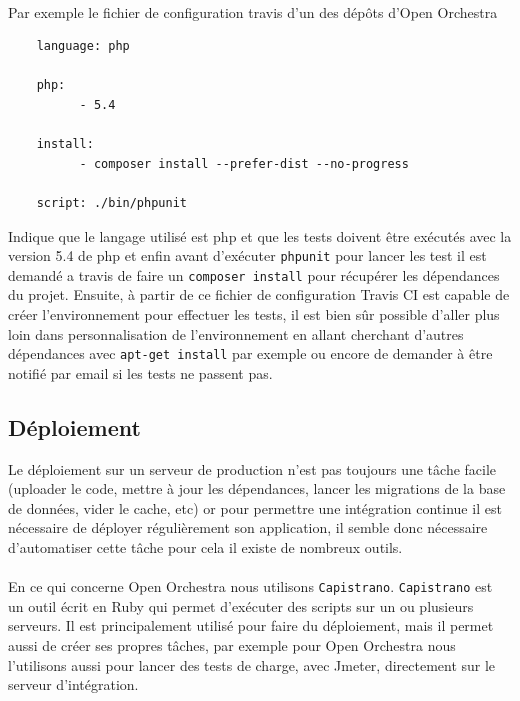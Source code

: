 \paragraph{}
Par exemple le fichier de configuration travis d'un des dépôts d'Open Orchestra 
\begin{verbatim}
    language: php

    php:
          - 5.4

    install:
          - composer install --prefer-dist --no-progress
 
    script: ./bin/phpunit
\end{verbatim}

Indique que le langage utilisé est php et que les tests doivent être exécutés avec la version 5.4 de php et enfin avant d'exécuter \verb?phpunit? pour lancer les test il est demandé a travis de faire un \verb?composer install? pour récupérer les dépendances du projet. Ensuite, à partir de ce fichier de configuration Travis CI est capable de créer l'environnement pour effectuer les tests, il est bien sûr possible d'aller plus loin dans  personnalisation de l'environnement en allant cherchant d'autres dépendances avec \verb?apt-get install? par exemple ou encore de demander à être notifié par email si les tests ne passent pas.

\subsection{Déploiement}
Le déploiement sur un serveur de production n'est pas toujours une tâche facile (uploader le code, mettre à jour les dépendances, lancer les migrations de la base de données, vider le cache, etc)  or pour permettre une intégration continue il est nécessaire de déployer régulièrement son application, il semble donc nécessaire d'automatiser cette tâche pour cela il existe de nombreux outils. 
\paragraph{}
En ce qui concerne Open Orchestra nous utilisons \verb?Capistrano?. \verb?Capistrano? est un outil écrit en Ruby qui permet d'exécuter des scripts sur un ou plusieurs serveurs. Il est principalement utilisé pour faire du déploiement, mais il permet aussi de créer ses propres tâches, par exemple pour Open Orchestra nous l'utilisons aussi pour lancer des tests de charge, avec Jmeter, directement sur le serveur d'intégration.
